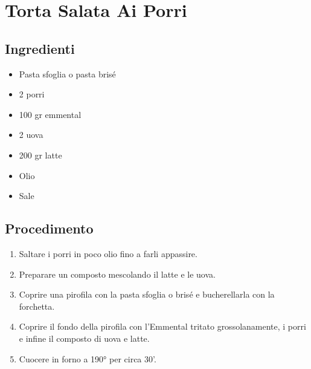 \section{Torta Salata Ai Porri}
\subsection{Ingredienti}
\begin{itemize}
\item Pasta sfoglia o pasta brisé  
\item 2 porri  
\item 100 gr emmental  
\item 2 uova  
\item 200 gr latte  
\item Olio  
\item Sale
\end{itemize}
\subsection{Procedimento}
\begin{enumerate}
\item  Saltare i porri in poco olio fino a farli appassire.  
\item  Preparare un composto mescolando il latte e le uova.  
\item  Coprire una pirofila con la pasta sfoglia o brisé e bucherellarla con la forchetta.  
\item  Coprire il fondo della pirofila con l'Emmental tritato grossolanamente, i porri e infine il composto di uova e latte.  
\item  Cuocere in forno a 190° per circa 30'.
\end{enumerate}
